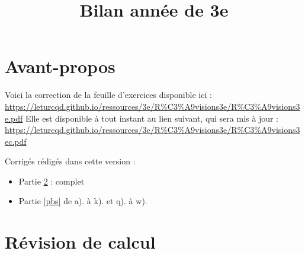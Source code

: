 \documentclass[14pt]{article}
\title{Bilan année de 3e}
\date{}
\theoremstyle{remark}
\newcounter{n}
\theoremstyle{plain}
\begin{document}
\section{Avant-propos}\label{init}
Voici la correction de la feuille d'exercices  disponible ici : \url{https://leturcqd.github.io/ressources/3e/R\%C3\%A9visions3e/R\%C3\%A9visions3e.pdf}
Elle est disponible à tout instant au lien suivant, qui sera mis à jour : \url{https://leturcqd.github.io/ressources/3e/R\%C3\%A9visions3e/R\%C3\%A9visions3ec.pdf}


Corrigés rédigés dans cette version : \begin{itemize}
\item Partie \ref{calc} : complet  
\item Partie \ref{pbs} de a). à k). et q). à w).
\end{itemize} 

\tableofcontents
\section{Révision de calcul}\label{calc} 
\end{document}

